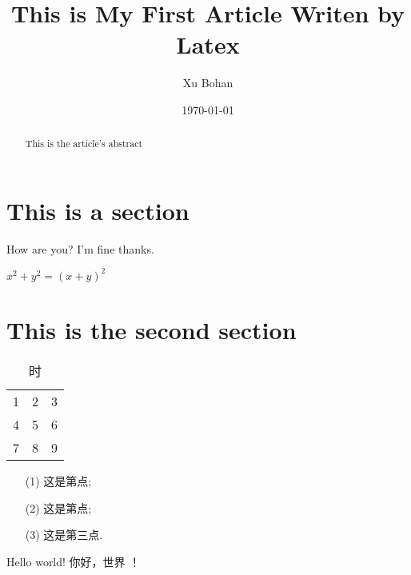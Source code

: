 \documentclass[a4paper]{article}
\title{This is My First Article Writen by Latex}
\author{Xu Bohan}
\date{\today}
\begin{document}
\maketitle

\begin{abstract}
    This is the article's abstract
\end{abstract}

\tableofcontents


\section{This is a section}
How are you?
I'm fine thanks.

$x^2+y^2 = (x+y)^2$
\section{This is the second section}
\begin{table}[htbp]
    \centering
    \caption{时}
    \begin{tabular}{ccc}
        1 & 2 & 3 \\
        4 & 5 & 6 \\
        7 & 8 & 9
    \end{tabular}\label{tab:table}
\end{table}

\begin{enumerate}
    \item[(1)] 这是第点;
    \item[(2)] 这是第点;
    \item[(3)] 这是第三点.
\end{enumerate}

Hello world!
你好，世界 ！
\end{document}
